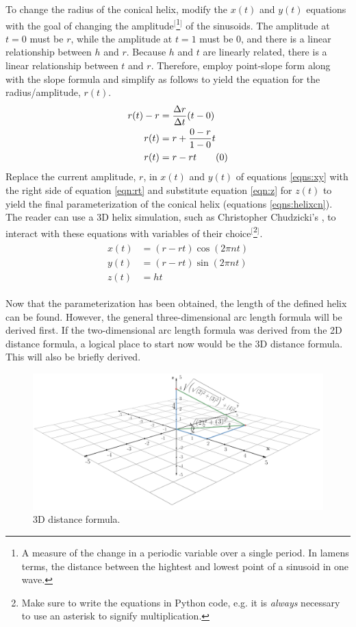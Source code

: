 \documentclass{article}
\begin{document}
To change the radius of the conical helix, modify the $x(t)$ and $y(t)$ equations with the goal of changing the amplitude$^[$\footnote{A measure of the change in a periodic variable over a single period. In lamens terms, the distance between the hightest and lowest point of a sinusoid in one wave.}$^]$ of the sinusoids. The amplitude at $t=0$ must be $r$, while the amplitude at $t=1$ must be $0$, and there is a linear relationship between $h$ and $r$. Because $h$ and $t$ are linearly related, there is a linear relationship between $t$ and $r$. Therefore, employ point-slope form along with the slope formula and simplify as follows to yield the equation for the radius/amplitude, $r(t)$.
\begin{align*}
    r(t)-r &= \frac{\Delta r}{\Delta t}(t-0)\\
    r(t) &= r+\frac{0-r}{1-0}t\\
    r(t) &= r-rt\tag{\theequation}\label{eqn:rt}
    \stepcounter{equation}
\end{align*}
Replace the current amplitude, $r$, in $x(t)$ and $y(t)$ of equations \ref{eqns:xy} with the right side of equation \ref{eqn:rt} and substitute equation \ref{eqn:z} for $z(t)$ to yield the final parameterization of the conical helix (equations \ref{eqns:helixcn}). The reader can use a 3D helix simulation, such as Christopher Chudzicki's \cite{Bib:sim}, to interact with these equations with variables of their choice$^[$\footnote{Make sure to write the equations in Python code, e.g. it is \textit{always} necessary to use an asterisk to signify multiplication.}$^]$.
\begin{align}\label{eqns:helixcn}
    \begin{split}
        x(t) &= (r-rt)\cos(2\pi nt)\\
        y(t) &= (r-rt)\sin(2\pi nt)\\
        z(t) &= ht
    \end{split}
\end{align}

\bigskip
Now that the parameterization has been obtained, the length of the defined helix can be found. However, the general three-dimensional arc length formula will be derived first. If the two-dimensional arc length formula was derived from the 2D distance formula, a logical place to start now would be the 3D distance formula. This will also be briefly derived.

\begin{figure}[h!]
    \centering
    \includegraphics[width=0.711\linewidth]{Blender/3Ddist.png}
    \caption{3D distance formula.}
    \label{fig:3Ddist}
\end{figure}
\end{document}
